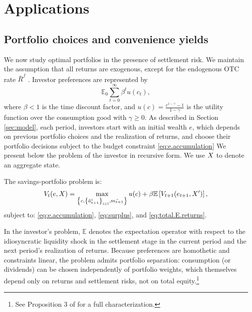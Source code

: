 \documentclass[12pt,american,english,notitlepage]{article}
\begin{document}
\FloatBarrier

 \section{ Applications}

\label{sec:applications}


\subsection{Portfolio choices and convenience yields}

We now study optimal portfolios in the presence of settlement risk. We
maintain the assumption that all returns are exogenous, except for
the endogenous OTC rate $\bar{R}^{f}$ . Investor preferences are represented
by
\begin{equation}
\mathbb{E}_{0}\sum_{t=0}^{\infty}\beta^{t}u(c_{t}),
\end{equation}
where $\beta<1$ is the time discount factor, and $u\left(c\right)=\frac{c^{1-\gamma}-1}{1-\gamma}$
is the utility function over the consumption good with $\gamma\ge0$.
As described in Section \ref{sec:model}, each period, investors start with an initial
wealth $e$, which depends on previous portfolio choices and the realization
of returns, and choose their portfolio decisions subject to the budget
constraint \eqref{eq:e.accumulation} We present below the problem
of the investor in recursive form. We use $X$ to denote an aggregate
state.

\begin{problem}The savings-portfolio problem
is:
\begin{equation}
V_{t}(e,X)=\max_{\left\{ c,\left\{ \tilde{a}_{t+1}^{i}\right\} _{i\in\mathbb{I}},\tilde{m_{t+1}}\right\} }u(c)+\beta\mathbb{E}\left[V_{t+1}(e_{t+1},X')\right],\label{eq:bellman-single}
\end{equation}
subject to: \eqref{eq:e.accumulation}, \eqref{eq:surplus}, and \eqref{eq:total.E.returns}.

\end{problem}

In the investor's problem, $\mathbb{E}$ denotes the expectation operator
with respect to the idiosyncratic liquidity shock in the settlement
stage in the current period and the next period's realization of returns.
Because preferences are homothetic and constraints linear, the problem admits portfolio separation: consumption (or dividends) can be chosen independently of portfolio weights, which themselves depend only on returns and settlement risks, not on total equity.\footnote{See Proposition 3 of \citet{BB17} for a full characterization.}
\end{document}
